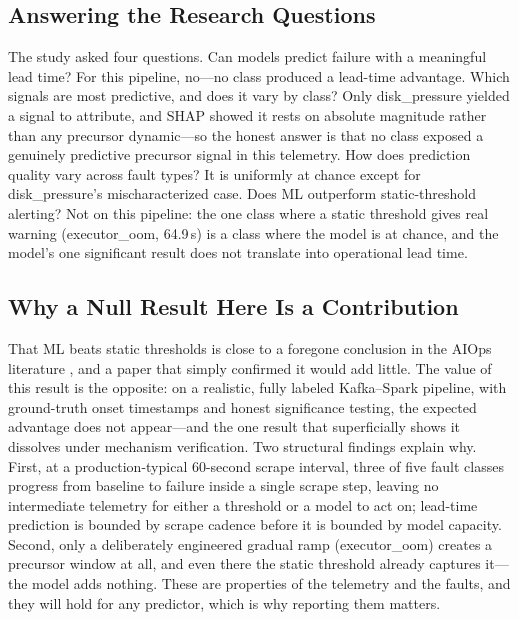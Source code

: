 \documentclass[conference]{IEEEtran}
\newcommand{\eo}{executor\_oom}
\newcommand{\dpr}{disk\_pressure}
\begin{document}
\subsection{Answering the Research Questions}
The study asked four questions. Can models predict failure with a meaningful lead time? For this pipeline, no---no class produced a lead-time advantage. Which signals are most predictive, and does it vary by class? Only \dpr{} yielded a signal to attribute, and SHAP showed it rests on absolute magnitude rather than any precursor dynamic---so the honest answer is that no class exposed a genuinely predictive precursor signal in this telemetry. How does prediction quality vary across fault types? It is uniformly at chance except for \dpr{}'s mischaracterized case. Does ML outperform static-threshold alerting? Not on this pipeline: the one class where a static threshold gives real warning (\eo{}, 64.9\,s) is a class where the model is at chance, and the model's one significant result does not translate into operational lead time.

\subsection{Why a Null Result Here Is a Contribution}
That ML beats static thresholds is close to a foregone conclusion in the AIOps literature \cite{notaro2021,wu2021,lin2018}, and a paper that simply confirmed it would add little. The value of this result is the opposite: on a realistic, fully labeled Kafka--Spark pipeline, with ground-truth onset timestamps and honest significance testing, the expected advantage does not appear---and the one result that superficially shows it dissolves under mechanism verification. Two structural findings explain why. First, at a production-typical 60-second scrape interval, three of five fault classes progress from baseline to failure inside a single scrape step, leaving no intermediate telemetry for either a threshold or a model to act on; lead-time prediction is bounded by scrape cadence before it is bounded by model capacity. Second, only a deliberately engineered gradual ramp (\eo{}) creates a precursor window at all, and even there the static threshold already captures it---the model adds nothing. These are properties of the telemetry and the faults, and they will hold for any predictor, which is why reporting them matters.
\end{document}
